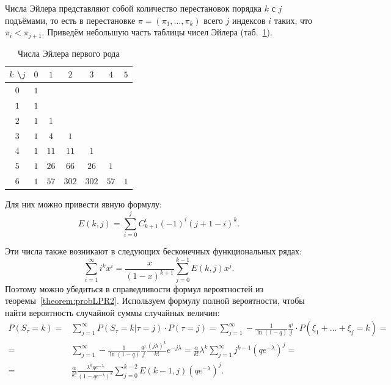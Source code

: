 \documentclass[12pt, specialist, subf, substylefile = spbu_report.rtx]{disser}
\begin{document}
	Числа Эйлера представляют собой количество перестановок порядка $k$ с $j$ подъёмами, то есть в перестановке $\pi = (\pi _1, \dots, \pi _k)$ всего $j$ индексов $i$ таких, что $\pi _i < \pi _{j + 1}$. Приведём небольшую часть таблицы чисел Эйлера (таб.~\ref{tab:eiler1}).

	\begin{table}[!ht]
		\centering
		\caption{Числа Эйлера первого рода}
		\begin{tabular}{c|cccccc}
			$k$ \textbackslash $j$ & $0$ & $1$ & $2$ & $3$ & $4$ & $5$\\ \hline
			$0$ & $1$ &  &  &  &  & \\
			$1$ & $1$ &  &  &  &  & \\
			$2$ & $1$ & $1$ &  &  &  & \\
			$3$ & $1$ & $4$ & $1$ &  &  & \\
			$4$ & $1$ & $11$ & $11$ & $1$ &  & \\
			$5$ & $1$ & $26$ & $66$ & $26$ & $1$ & \\
			$6$ & $1$ & $57$ & $302$ & $302$ & $57$ & $1$ \\
		\end{tabular}
		\label{tab:eiler1}
	\end{table}

	Для них можно привести явную формулу:
	\[
		E(k, j) = \sum \limits ^j _{i = 0} C ^i _{k + 1} (-1) ^i (j + 1 - i) ^k.
	\]

	Эти числа также возникают в следующих бесконечных функциональных рядах:
	\[
		\sum \limits ^\infty _{i = 1} i ^k x ^i = \frac {x} {(1 - x) ^{k + 1}} \sum \limits ^{k - 1} _{j = 0} E(k, j) x ^j.
	\]
	Поэтому можно убедиться в справедливости формул вероятностей из теоремы~\ref{theorem:probLPR2}. Используем формулу полной вероятности, чтобы найти вероятность случайной суммы случайных величин:
	\[
		\begin{aligned}
			P(S _\tau = k) =& \sum \limits ^{\infty} _{j = 1} P(\left.S _\tau = k\right| \tau = j) \cdot P(\tau = j) = \sum \limits ^{\infty} _{j = 1} - \frac 1 {\ln(1 - q)} \frac {q ^j} j \cdot P(\xi _1 + \dots + \xi _j = k) =\\
			=& \sum \limits ^{\infty} _{j = 1} - \frac 1 {\ln(1 - q)} \frac {q ^j} j \frac {(j \lambda) ^k} {k !} e ^{-j \lambda} = \frac \alpha {k !} \lambda ^k \sum \limits ^{\infty} _{j = 1} j ^{k - 1} \left(q e ^{-\lambda}\right) ^j =\\
			=& \frac \alpha {k !} \frac {\lambda ^k q e ^{-\lambda}} {\left(1 - q e ^{-\lambda}\right) ^k} \sum \limits ^{k - 2} _{j = 0} E(k - 1, j) \left(q e ^{-\lambda}\right) ^j.
		\end{aligned}
	\]
	
\end{document}
